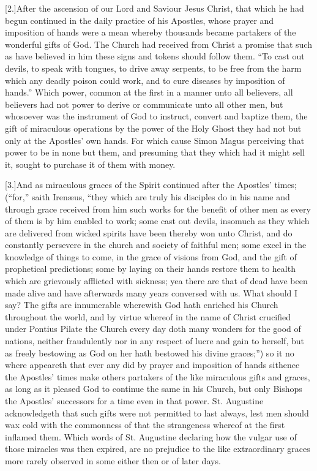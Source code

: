 [2.]After the ascension of our Lord and Saviour Jesus Christ, that which he had begun continued in the daily practice of his Apostles, whose prayer and imposition of hands were a mean whereby thousands became partakers of the wonderful gifts of God. The Church had received from Christ a promise that such as have believed in him these signs and tokens should follow them. “To cast out devils, to speak with tongues, to drive away serpents, to be free from the harm which any deadly poison could work, and to cure diseases by imposition of hands.” Which power, common at the first in a manner unto all believers, all believers had not power to derive or communicate unto all other men, but whosoever was the instrument of God to instruct, convert and baptize them, the gift of miraculous operations by the power of the Holy Ghost they had not but only at the Apostles’ own hands. For which cause Simon Magus perceiving that power to be in none but them, and presuming that they which had it might sell it, sought to purchase it of them with money.




[3.]And as miraculous graces of the Spirit continued after the Apostles’ times; (“for,” saith Irenæus, “they which are truly his disciples do in his name and through grace received from him such works for the benefit of other men as every of them is by him enabled to work; some cast out devils, insomuch as they which are delivered from wicked spirits have been thereby won unto Christ, and do constantly persevere in the church and society of faithful men; some excel in the knowledge of things to come, in the grace of visions from God, and the gift of prophetical predictions; some by laying on their hands restore them to health which are grievously afflicted with sickness; yea there are that of dead have been made alive and have afterwards many years conversed with us. What should I say? The gifts are innumerable wherewith God hath enriched his Church throughout the world, and by virtue whereof in the name of Christ crucified under Pontius Pilate the Church every day doth many wonders for the good of nations, neither fraudulently nor in any respect of lucre and gain to herself, but as freely bestowing as God on her hath bestowed his divine graces;”) so it no where appeareth that ever any did by prayer and imposition of hands sithence the Apostles’ times make others partakers of the like miraculous gifts and graces, as long as it pleased God to continue the same in his Church, but only Bishops the Apostles’ successors for a time even in that power. St. Augustine acknowledgeth that such gifts were not permitted to last always, lest men should wax cold with the commonness of that the strangeness whereof at the first inflamed them. Which words of St. Augustine declaring how the  vulgar use of those miracles was then expired, are no prejudice to the like extraordinary graces more rarely observed in some either then or of later days.

